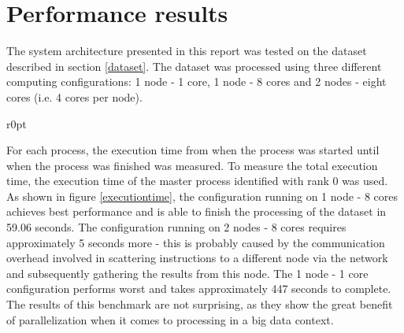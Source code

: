 \documentclass[paper=a4, fontsize=11pt]{scrartcl}
\numberwithin{equation}{section}		%
\numberwithin{figure}{section}			%
\numberwithin{table}{section}				%
\begin{document}
\section{Performance results}
The system architecture presented in this report was tested on the dataset described in section \ref{dataset}. The dataset was processed using three different computing configurations: 1 node - 1 core, 1 node - 8 cores and 2 nodes - eight cores (i.e. 4 cores per node).
\begin{wrapfigure}{r}{0pt}
\label{executiontime}
\caption{Performance benchmark}
\end{wrapfigure}
For each process, the execution time from when the process was started until when the process was finished was measured. To measure the total execution time, the execution time of the master process identified with rank 0 was used.
\newline
As shown in figure \ref{executiontime}, the configuration running on 1 node - 8 cores achieves best performance and is able to finish the processing of the dataset in 59.06 seconds. The configuration running on 2 nodes - 8 cores requires approximately 5 seconds more - this is probably caused by the communication overhead involved in scattering instructions to a different node via the network and subsequently gathering the results from this node. The 1 node - 1 core configuration performs worst and takes approximately 447 seconds to complete. The results of this benchmark are not surprising, as they show the great benefit of parallelization when it comes to processing in a big data context.
\end{document}

